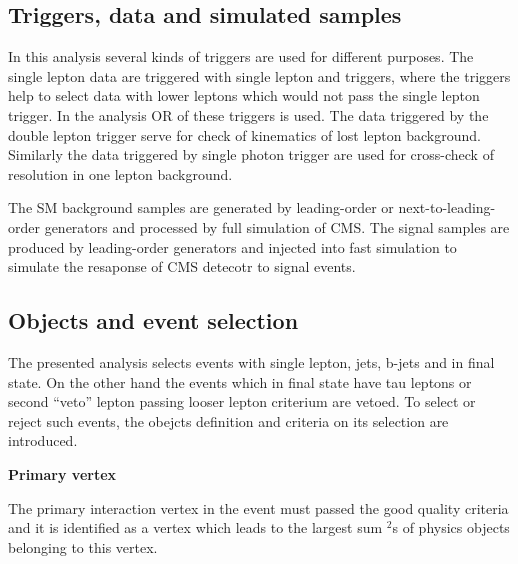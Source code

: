 

\subsection{Triggers, data and simulated samples~\label{sec:trigger}}

In this analysis several kinds of triggers are used for different purposes. The single lepton data are triggered with single lepton and \MET triggers, where the \MET triggers help to select data with lower \pt leptons which would not pass the single lepton trigger. In the analysis OR of these triggers is used. The data triggered by the double lepton trigger serve for check of kinematics of lost lepton background. Similarly the data triggered by single photon trigger are used for cross-check of \MET resolution in one lepton background.

The SM background samples are generated by leading-order or next-to-leading-order generators and processed by full simulation of CMS. The signal samples are produced by leading-order generators and injected into fast simulation to simulate the resaponse of CMS detecotr to signal events.

\subsection{Objects and event selection~\label{sec:objects}}

The presented analysis selects events with single lepton, jets, b-jets and \MET in final state. On the other hand the events which in final state have tau leptons or second ``veto'' lepton passing looser lepton criterium are vetoed. To select or reject such events, the obejcts definition and criteria on its selection are introduced.

\textbf{Primary vertex}

The primary interaction vertex in the event must passed the good quality criteria and it is identified as a vertex which leads to the largest sum \pt$^{2}$s of physics objects belonging to this vertex.

